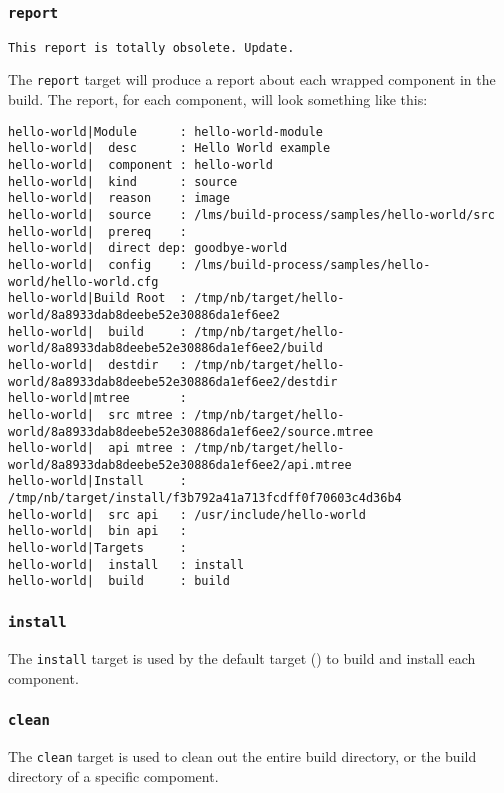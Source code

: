\subsubsection{\texttt{report}}\texttt{This report is totally
  obsolete.  Update.}

The \texttt{report} target will produce a report about each wrapped
component in the build.  The report, for each component, will look
something like this:

\begin{footnotesize}
\begin{verbatim}
hello-world|Module      : hello-world-module
hello-world|  desc      : Hello World example
hello-world|  component : hello-world
hello-world|  kind      : source
hello-world|  reason    : image
hello-world|  source    : /lms/build-process/samples/hello-world/src
hello-world|  prereq    :
hello-world|  direct dep: goodbye-world
hello-world|  config    : /lms/build-process/samples/hello-world/hello-world.cfg
hello-world|Build Root  : /tmp/nb/target/hello-world/8a8933dab8deebe52e30886da1ef6ee2
hello-world|  build     : /tmp/nb/target/hello-world/8a8933dab8deebe52e30886da1ef6ee2/build
hello-world|  destdir   : /tmp/nb/target/hello-world/8a8933dab8deebe52e30886da1ef6ee2/destdir
hello-world|mtree       :
hello-world|  src mtree : /tmp/nb/target/hello-world/8a8933dab8deebe52e30886da1ef6ee2/source.mtree
hello-world|  api mtree : /tmp/nb/target/hello-world/8a8933dab8deebe52e30886da1ef6ee2/api.mtree
hello-world|Install     : /tmp/nb/target/install/f3b792a41a713fcdff0f70603c4d36b4
hello-world|  src api   : /usr/include/hello-world
hello-world|  bin api   :
hello-world|Targets     :
hello-world|  install   : install
hello-world|  build     : build
\end{verbatim}
\end{footnotesize}

\subsubsection{\texttt{install}}

The \texttt{install} target is used by the default target
() to build and install each component.

\subsubsection{\texttt{clean}}

The \texttt{clean} target is used to clean out the entire build
directory, or the build directory of a specific compoment.

